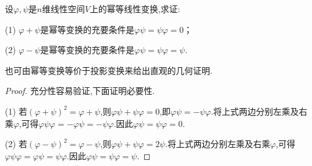 \documentclass[../../main.tex]{subfiles}%
\begin{document}
\begin{proposition}\label{proposition:幂等变换的和与差仍是幂等变换的充要条件1}
设\(\varphi,\psi\)是\(n\)维线性空间\(V\)上的幂等线性变换,求证:

(1) \(\varphi+\psi\)是幂等变换的充要条件是\(\varphi\psi=\psi\varphi = 0\)；

(2) \(\varphi-\psi\)是幂等变换的充要条件是\(\varphi\psi=\psi\varphi=\psi\).
\end{proposition}
\begin{note}
也可由幂等变换等价于投影变换来给出直观的几何证明.
\end{note}
\begin{proof}

充分性容易验证,下面证明必要性.

(1) 若\((\varphi+\psi)^2=\varphi+\psi\),则\(\varphi\psi+\psi\varphi = 0\),即\(\varphi\psi=-\psi\varphi\).将上式两边分别左乘及右乘\(\varphi\),可得\(\varphi\psi\varphi=-\varphi\psi=-\psi\varphi\).因此\(\varphi\psi=\psi\varphi = 0\).

(2) 若\((\varphi - \psi)^2=\varphi - \psi\),则\(\varphi\psi+\psi\varphi = 2\psi\).将上式两边分别左乘及右乘\(\varphi\),可得\(\varphi\psi\varphi=\varphi\psi=\psi\varphi\).因此\(\varphi\psi=\psi\varphi=\psi\).

\end{proof}
\end{document}
